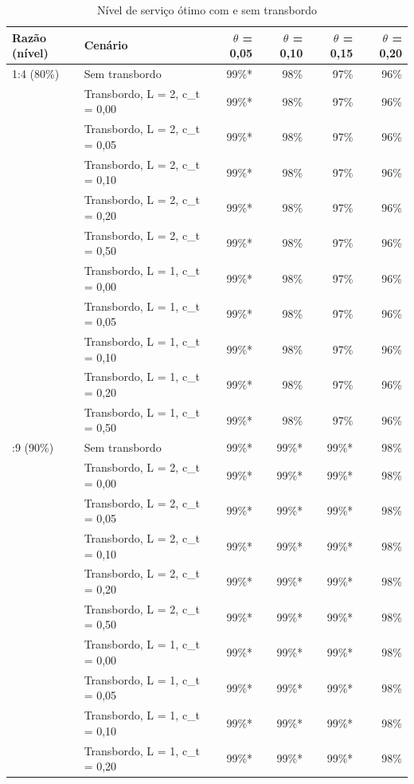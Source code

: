 \begin{table}[htbp]
\centering
\small
\caption{Nível de serviço ótimo com e sem transbordo}
\label{tab:tb_nivel_otimo}
\begin{tabular}{llrrrr}
\toprule
Razão (nível) & Cenário & $\theta$ = 0,05 & $\theta$ = 0,10 & $\theta$ = 0,15 & $\theta$ = 0,20 \\
\midrule
1:4 (80\%) & Sem transbordo & 99\%* & 98\% & 97\% & 96\% \\
 & Transbordo, L = 2, c\_t = 0,00 & 99\%* & 98\% & 97\% & 96\% \\
 & Transbordo, L = 2, c\_t = 0,05 & 99\%* & 98\% & 97\% & 96\% \\
 & Transbordo, L = 2, c\_t = 0,10 & 99\%* & 98\% & 97\% & 96\% \\
 & Transbordo, L = 2, c\_t = 0,20 & 99\%* & 98\% & 97\% & 96\% \\
 & Transbordo, L = 2, c\_t = 0,50 & 99\%* & 98\% & 97\% & 96\% \\
 & Transbordo, L = 1, c\_t = 0,00 & 99\%* & 98\% & 97\% & 96\% \\
 & Transbordo, L = 1, c\_t = 0,05 & 99\%* & 98\% & 97\% & 96\% \\
 & Transbordo, L = 1, c\_t = 0,10 & 99\%* & 98\% & 97\% & 96\% \\
 & Transbordo, L = 1, c\_t = 0,20 & 99\%* & 98\% & 97\% & 96\% \\
 & Transbordo, L = 1, c\_t = 0,50 & 99\%* & 98\% & 97\% & 96\% \\
\addlinespace
1:9 (90\%) & Sem transbordo & 99\%* & 99\%* & 99\%* & 98\% \\
 & Transbordo, L = 2, c\_t = 0,00 & 99\%* & 99\%* & 99\%* & 98\% \\
 & Transbordo, L = 2, c\_t = 0,05 & 99\%* & 99\%* & 99\%* & 98\% \\
 & Transbordo, L = 2, c\_t = 0,10 & 99\%* & 99\%* & 99\%* & 98\% \\
 & Transbordo, L = 2, c\_t = 0,20 & 99\%* & 99\%* & 99\%* & 98\% \\
 & Transbordo, L = 2, c\_t = 0,50 & 99\%* & 99\%* & 99\%* & 98\% \\
 & Transbordo, L = 1, c\_t = 0,00 & 99\%* & 99\%* & 99\%* & 98\% \\
 & Transbordo, L = 1, c\_t = 0,05 & 99\%* & 99\%* & 99\%* & 98\% \\
 & Transbordo, L = 1, c\_t = 0,10 & 99\%* & 99\%* & 99\%* & 98\% \\
 & Transbordo, L = 1, c\_t = 0,20 & 99\%* & 99\%* & 99\%* & 98\% \\

\end{tabular}
\end{table}
